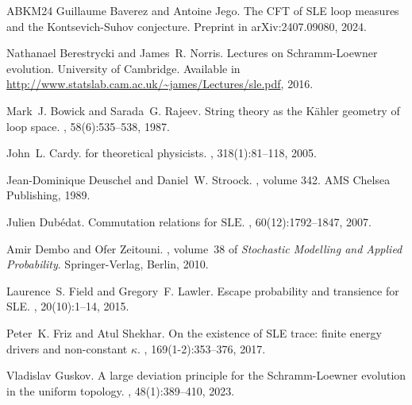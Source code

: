 \documentclass[a4paper, 11pt]{article}
\theoremstyle{definition}
\numberwithin{equation}{section}
\numberwithin{figure}{section}
\begin{document}
\begin{thebibliography}{ABKM24}
Guillaume Baverez and Antoine Jego.
\newblock The {CFT} of {SLE} loop measures and the {K}ontsevich-{S}uhov
  conjecture.
\newblock Preprint in arXiv:2407.09080, 2024.

Nathanael Berestrycki and James~R. Norris.
\newblock Lectures on {S}chramm-{L}oewner evolution.
\newblock University of Cambridge. Available in
  \url{http://www.statslab.cam.ac.uk/~james/Lectures/sle.pdf}, 2016.

Mark~J. Bowick and Sarada~G. Rajeev.
\newblock String theory as the {K}{\"a}hler geometry of loop space.
, 58(6):535--538, 1987.

John~L. Cardy.
 for theoretical physicists.
, 318(1):81--118, 2005.

Jean-Dominique Deuschel and Daniel~W. Stroock.
, volume 342.
\newblock AMS Chelsea Publishing, 1989.

Julien Dub{\'e}dat.
\newblock Commutation relations for {$\mathrm{SLE}$}.
, 60(12):1792--1847, 2007.

Amir Dembo and Ofer Zeitouni.
, volume~38 of {\em
  Stochastic Modelling and Applied Probability}.
\newblock Springer-Verlag, Berlin, 2010.

Laurence~S. Field and Gregory~F. Lawler.
\newblock Escape probability and transience for {SLE}.
, 20(10):1--14, 2015.

Peter~K. Friz and Atul Shekhar.
\newblock On the existence of {SLE} trace: finite energy drivers and
  non-constant {$\kappa$}.
, 169(1-2):353--376, 2017.

Vladislav Guskov.
\newblock A large deviation principle for the {S}chramm-{L}oewner evolution in
  the uniform topology.
, 48(1):389--410, 2023.


\end{thebibliography}
\end{document}

